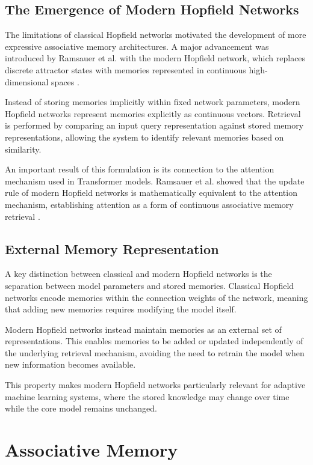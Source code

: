 \subsection{The Emergence of Modern Hopfield Networks}

The limitations of classical Hopfield networks motivated the development of more expressive associative memory architectures. A major advancement was introduced by Ramsauer et al. with the modern Hopfield network, which replaces discrete attractor states with memories represented in continuous high-dimensional spaces \cite{ramsauer2021hopfield}.

Instead of storing memories implicitly within fixed network parameters, modern Hopfield networks represent memories explicitly as continuous vectors. Retrieval is performed by comparing an input query representation against stored memory representations, allowing the system to identify relevant memories based on similarity.

An important result of this formulation is its connection to the attention mechanism used in Transformer models. Ramsauer et al. showed that the update rule of modern Hopfield networks is mathematically equivalent to the attention mechanism, establishing attention as a form of continuous associative memory retrieval \cite{ramsauer2021hopfield,vaswani2017attention}.

\subsection{External Memory Representation}

A key distinction between classical and modern Hopfield networks is the separation between model parameters and stored memories. Classical Hopfield networks encode memories within the connection weights of the network, meaning that adding new memories requires modifying the model itself. 

Modern Hopfield networks instead maintain memories as an external set of representations. This enables memories to be added or updated independently of the underlying retrieval mechanism, avoiding the need to retrain the model when new information becomes available.

This property makes modern Hopfield networks particularly relevant for adaptive machine learning systems, where the stored knowledge may change over time while the core model remains unchanged.

\section{Associative Memory}


